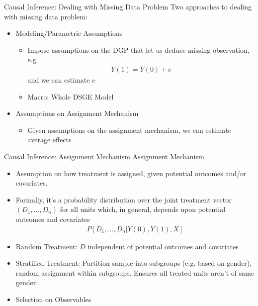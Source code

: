 \documentclass[aspectratio=169, handout]{beamer}
\begin{document}
{\footnotesize
\begin{frame}{Causal Inference: Dealing with Missing Data Problem}
Two approaches to dealing with missing data problem:
\begin{itemize}
  \item \alert{Modeling/Parametric Assumptions}
    \begin{itemize}
      \item Impose assumptions on the DGP that let us deduce missing
        observation, e.g.
        \begin{align*}
          Y(1)=Y(0)+c
        \end{align*}
        and we can estimate $c$

      \item Macro: Whole DSGE Model
    \end{itemize}

  \item \alert{Assumptions on Assignment Mechanism}
    \begin{itemize}
      \item Given assumptions on the assignment mechanism, we can
        estimate average effects
    \end{itemize}
\end{itemize}
\end{frame}
}



{\footnotesize
\begin{frame}{Causal Inference: Assignment Mechanism}
\alert{Assignment Mechanism}
\begin{itemize}
  \item Assumption on how treatment is assigned, given potential
    outcomes and/or covariates.

  \item Formally, it's a probability distribution over the joint
    treatment vector $(D_1,\ldots,D_n)$ for all units which, in general,
    depends upon potential outcomes and covariates
    \begin{align*}
      P[D_1,\ldots,D_n|Y(0),Y(1),X]
    \end{align*}
  \item Random Treatment:
    $D$ independent of potential outcomes and covariates
  \item Stratified Treatment:
    Partition sample into subgroups (e.g. based on gender), random
    assignment within subgroups.
    Ensures all treated units aren't of same gender.
  \item Selection on Observables
\end{itemize}
\end{frame}
}
\end{document}
